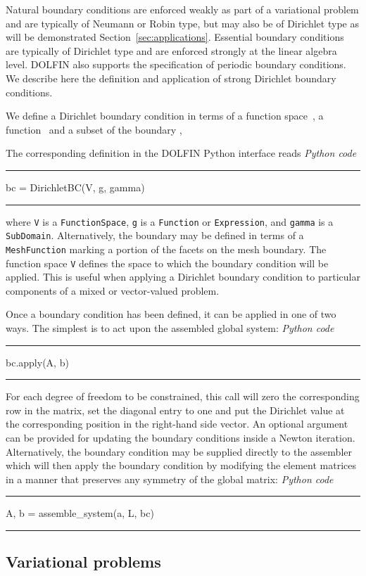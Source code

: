 \documentclass[acmtoms]{acmtrans2m}
\newenvironment{pythoncode}[1]{\center\minipage{#1\textwidth}\footnotesize\hfill\it Python code \rm\vspace{0.1cm}\hrule\renewcommand{\baselinestretch}{0.9}\footnotesize\verbatim}{\endverbatim\hrule\normalsize\endminipage\newline\endcenter}
\newcommand{\emp}[1]{\texttt{#1}}
\newcommand{\dolfin}{DOLFIN}
\begin{document}
Natural boundary conditions are enforced weakly as part of
a variational problem and are typically of Neumann or Robin type, but
may also be of Dirichlet type as will be demonstrated
Section~\ref{sec:applications}. Essential boundary conditions are
typically of Dirichlet type and are enforced strongly at the linear
algebra level. \dolfin{} also supports the specification of periodic
boundary conditions. We describe here the definition and application
of strong Dirichlet boundary conditions.

We define a Dirichlet boundary condition in terms of a function
space~, a function~ and a subset of the boundary ,

The corresponding definition in the \dolfin{} Python interface reads
\begin{pythoncode}{0.9}
bc = DirichletBC(V, g, gamma)
\end{pythoncode}
where \emp{V} is a \emp{FunctionSpace}, \emp{g} is a \emp{Function} or
\emp{Expression}, and \emp{gamma} is a
\emp{SubDomain}. Alternatively, the boundary may be defined in terms
of a \emp{MeshFunction} marking a portion of the facets on the mesh
boundary.  The function space \emp{V} defines the space to which the
boundary condition will be applied. This is useful when applying a
Dirichlet boundary condition to particular components of a mixed or
vector-valued problem.

Once a boundary condition has been defined, it can be applied in one of two
ways. The simplest is to act upon the assembled global system:
\begin{pythoncode}{0.9}
bc.apply(A, b)
\end{pythoncode}
For each degree of freedom to be constrained, this call will zero the
corresponding row in the matrix, set the diagonal entry to one and put
the Dirichlet value at the corresponding position in the right-hand side
vector. An optional argument can be provided for updating the boundary
conditions inside a Newton iteration.  Alternatively, the
boundary condition may be supplied directly to the assembler which
will then apply the boundary condition by modifying the element matrices
in a manner that preserves any symmetry of the global matrix:
\begin{pythoncode}{0.9}
A, b = assemble_system(a, L, bc)
\end{pythoncode}

\subsection{Variational problems}
\end{document}

